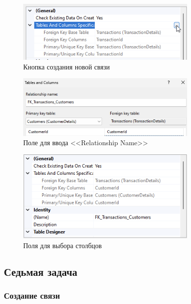 \documentclass[a4paper, 14pt]{extarticle}
\begin{document}
\begin{figure}[H]
  \centering
  \includegraphics[width=0.8\textwidth]{images/task-6/3.png}
  \caption{Кнопка создания новой связи}
  \label{fig:task-6-3}
\end{figure}

\begin{figure}[H]
  \centering
  \includegraphics[width=0.8\textwidth]{images/task-6/4.png}
  \caption{Поле для ввода <<Relationship Name>>}
  \label{fig:task-6-4}
\end{figure}

\begin{figure}[H]
  \centering
  \includegraphics[width=0.8\textwidth]{images/task-6/5.png}
  \caption{Поля для выбора столбцов}
  \label{fig:task-6-5}
\end{figure}

\subsection{Седьмая задача}

\subsubsection{Создание связи}
\end{document}
